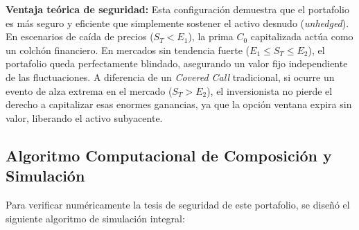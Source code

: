 \documentclass[12pt]{article}
\begin{document}
\textbf{Ventaja teórica de seguridad:} Esta configuración demuestra que el portafolio es más seguro y eficiente que simplemente sostener el activo desnudo (\textit{unhedged}). En escenarios de caída de precios ($S_T < E_1$), la prima $C_0$ capitalizada actúa como un colchón financiero. En mercados sin tendencia fuerte ($E_1 \leq S_T \leq E_2$), el portafolio queda perfectamente blindado, asegurando un valor fijo independiente de las fluctuaciones. A diferencia de un \textit{Covered Call} tradicional, si ocurre un evento de alza extrema en el mercado ($S_T > E_2$), el inversionista no pierde el derecho a capitalizar esas enormes ganancias, ya que la opción ventana expira sin valor, liberando el activo subyacente.

\subsection{Algoritmo Computacional de Composición y Simulación}

Para verificar numéricamente la tesis de seguridad de este portafolio, se diseñó el siguiente algoritmo de simulación integral:
\end{document}
